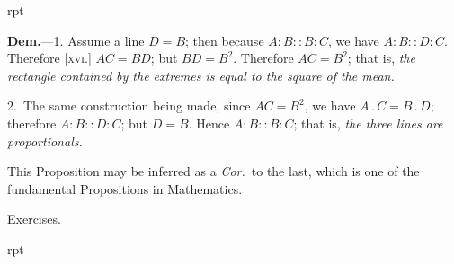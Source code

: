 \documentclass[oneside]{book}
\newcommand\exhead[1]{
\Needspace*{5\baselineskip}\begin{center}
\textsf{#1}
\end{center}
}
\newcommand\imgflow[3]{
\setcounter{wrapwidth}{#1}
\begin{wrapfigure}[#2]{r}{\value{wrapwidth}pt}
\begin{center}
\vspace{-0.3in}
\end{center}
\end{wrapfigure}
}
\begin{document}
\imgflow{118}{6}{f189}

\textbf{Dem.}---1. Assume a line $D = B$; then because $A : B
:: B : C$, we have $A : B :: D : C$.
Therefore [\textsc{xvi.}]\label{XVI} $AC = BD$; but
$BD = B^{2}$. Therefore $AC = B^{2}$;
that is, \emph{the rectangle contained
by the extremes is equal to the
square of the mean.}

2.~The same construction being made, since $AC = B^{2}$,
we have $A\,.\,C = B\,.\,D$; therefore $A : B :: D : C$; but
$D = B$. Hence $A : B :: B : C$; that is, \emph{the three lines
are proportionals.}

\smallskip
\begin{footnotesize}
This Proposition may be inferred as a \emph{Cor.}\ to the last, which
is one of the fundamental Propositions in Mathematics.
\par\end{footnotesize}


\exhead{Exercises.}

\imgflow{100}{12}{f190}
\end{document}
